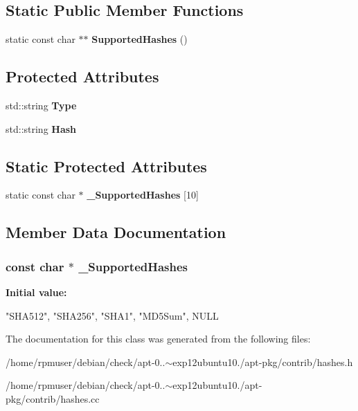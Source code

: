 \subsection*{\-Static \-Public \-Member \-Functions}
\begin{DoxyCompactItemize}
\item 
static const char $\ast$$\ast$ {\bfseries \-Supported\-Hashes} ()\label{classHashString_a9c5f43c8485723811929e03c8c0a00bb}

\end{DoxyCompactItemize}
\subsection*{\-Protected \-Attributes}
\begin{DoxyCompactItemize}
\item 
std\-::string {\bfseries \-Type}\label{classHashString_a6fcef4329ae329f0b7b6b8d739be7121}

\item 
std\-::string {\bfseries \-Hash}\label{classHashString_a417a37f1811657fbb9c545558b6de2f7}

\end{DoxyCompactItemize}
\subsection*{\-Static \-Protected \-Attributes}
\begin{DoxyCompactItemize}
\item 
static const char $\ast$ {\bfseries \-\_\-\-Supported\-Hashes} [10]
\end{DoxyCompactItemize}


\subsection{\-Member \-Data \-Documentation}
\subsubsection[{\-\_\-\-Supported\-Hashes}]{\setlength{\rightskip}{0pt plus 5cm}const char $\ast$ \-\_\-\-Supported\-Hashes\hspace{0.3cm}{\ttfamily  [static, protected]}}\label{classHashString_a16337c9c40044ea213380f352e935362}
{\bfseries \-Initial value\-:}
\begin{DoxyCode}
 
{
   "SHA512", "SHA256", "SHA1", "MD5Sum", NULL
}
\end{DoxyCode}


\-The documentation for this class was generated from the following files\-:\begin{DoxyCompactItemize}
\item 
/home/rpmuser/debian/check/apt-\/0..$\sim$exp12ubuntu10./apt-\/pkg/contrib/hashes.\-h\item 
/home/rpmuser/debian/check/apt-\/0..$\sim$exp12ubuntu10./apt-\/pkg/contrib/hashes.\-cc\end{DoxyCompactItemize}

